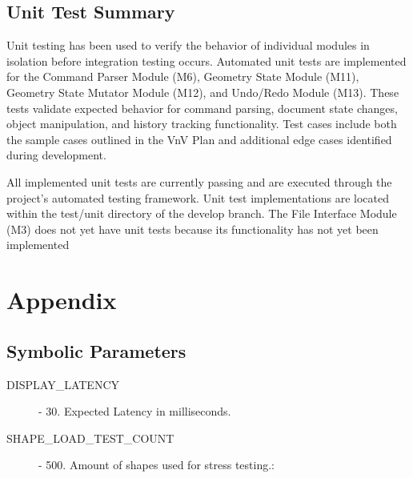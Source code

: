 \documentclass[12pt, titlepage]{article}
\begin{document}

\subsection{Unit Test Summary}

Unit testing has been used to verify the behavior of individual modules in isolation before integration testing occurs. 
Automated unit tests are implemented for the Command Parser Module (M6), Geometry State Module (M11), Geometry State 
Mutator Module (M12), and Undo/Redo Module (M13). These tests validate expected behavior for command parsing, document 
state changes, object manipulation, and history tracking functionality. Test cases include both the sample cases 
outlined in the VnV Plan and additional edge cases identified during development.

All implemented unit tests are currently passing and are executed through the project's automated testing framework. 
Unit test implementations are located within the test/unit directory of the develop branch. The File Interface Module 
(M3) does not yet have unit tests because its functionality has not yet been implemented

\newpage





\newpage

\section{Appendix}


\subsection{Symbolic Parameters}

\begin{description}
  \item[DISPLAY\_LATENCY] - 30. Expected Latency in milliseconds.
\end{description}

\begin{description}
  \item[SHAPE\_LOAD\_TEST\_COUNT] - 500.  Amount of shapes used for stress testing.:
\end{description}
\end{document}
